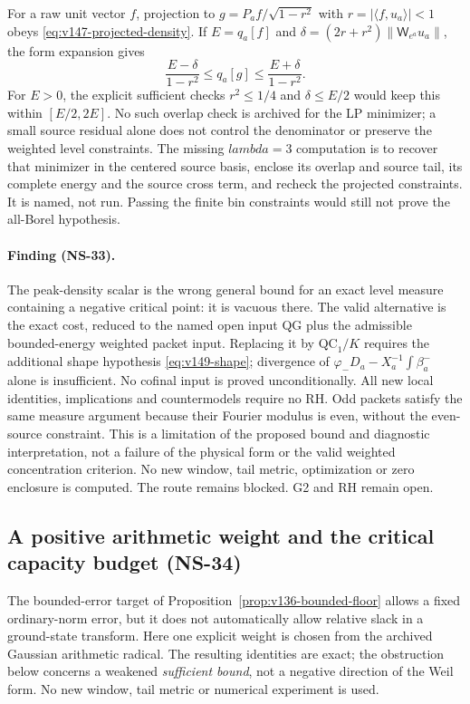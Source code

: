 \documentclass[11pt]{article}
\def\lambda{lambda}%
\theoremstyle{remark}
\begin{document}
For a raw unit vector $f$, projection to
$g=P_af/\sqrt{1-r^2}$ with $r=|\langle f,u_a\rangle|<1$ obeys
\eqref{eq:v147-projected-density}. If $E=q_a[f]$ and
$\delta=(2r+r^2)\|\mathsf W_{e^a}u_a\|$, the form expansion gives
\[
 \frac{E-\delta}{1-r^2}\le q_a[g]\le\frac{E+\delta}{1-r^2}.
\]
For $E>0$, the explicit sufficient checks $r^2\le1/4$ and
$\delta\le E/2$ would keep this within $[E/2,2E]$. No such overlap
check is archived for the LP minimizer; a small source residual alone
does not control the denominator or preserve the weighted level
constraints. The missing $\lambda=3$ computation is to recover that
minimizer in the centered source basis, enclose its overlap and source
tail, its complete energy and the source cross term, and recheck the
projected constraints. It is named, not run. Passing the finite bin
constraints would still not prove the all-Borel hypothesis.

\paragraph{Finding (NS-33).}
The peak-density scalar is the wrong general bound for an exact level
measure containing a negative critical point: it is vacuous there.
The valid alternative is the exact cost, reduced to the named open
input QG plus the admissible bounded-energy weighted packet input.
Replacing it by $\mathrm{QC}_1/K$ requires the additional shape
hypothesis \eqref{eq:v149-shape}; divergence of
$\varphi_-D_a-X_a^{-1}\int\beta_a^-$ alone is insufficient. No cofinal
input is proved unconditionally. All new local identities, implications
and countermodels require no RH. Odd packets satisfy the same measure
argument because their Fourier modulus is even, without the even-source
constraint. This is a limitation of the proposed bound and diagnostic
interpretation, not a failure of the physical form or the valid weighted
concentration criterion. No new window, tail metric, optimization or zero
enclosure is computed. The route remains blocked. G2 and RH remain open.


\subsection{A positive arithmetic weight and the critical capacity budget (NS-34)}

The bounded-error target of Proposition~\ref{prop:v136-bounded-floor}
allows a fixed ordinary-norm error, but it does not automatically allow
relative slack in a ground-state transform. Here one explicit weight is
chosen from the archived Gaussian arithmetic radical. The resulting
identities are exact; the obstruction below concerns a weakened
\emph{sufficient bound}, not a negative direction of the Weil form.
No new window, tail metric or numerical experiment is used.
\end{document}
